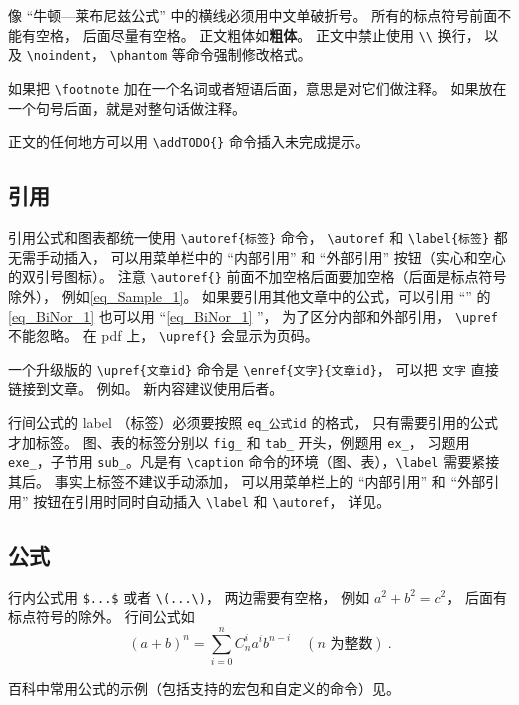 像 “牛顿—莱布尼兹公式” 中的横线必须用中文单破折号。 所有的标点符号前面不能有空格， 后面尽量有空格。 正文粗体如\textbf{粗体}。 正文中禁止使用 \verb`\\` 换行， 以及 \verb`\noindent`， \verb`\phantom` 等命令强制修改格式。

如果把 \verb`\footnote` 加在一个名词或者短语后面，意思是对它们做注释。 如果放在一个句号后面，就是对整句话做注释。

正文的任何地方可以用 \verb`\addTODO{}` 命令插入未完成提示。

\subsection{引用}
引用公式和图表都统一使用 \verb`\autoref{标签}` 命令， \verb`\autoref` 和 \verb`\label{标签}` 都无需手动插入， 可以用菜单栏中的 “内部引用” 和 “外部引用” 按钮（实心和空心的双引号图标）。 注意 \verb`\autoref{}` 前面不加空格后面要加空格（后面是标点符号除外）， 例如\autoref{eq_Sample_1}。 如果要引用其他文章中的公式，可以引用 “” 的\autoref{eq_BiNor_1} 也可以用 “\autoref{eq_BiNor_1} ”， 为了区分内部和外部引用， \verb`\upref` 不能忽略。 在 pdf 上， \verb`\upref{}` 会显示为页码。

一个升级版的 \verb`\upref{文章id}` 命令是 \verb`\enref{文字}{文章id}`， 可以把 \verb`文字` 直接链接到文章。 例如。 新内容建议使用后者。

行间公式的 label （标签）必须要按照 \verb`eq_公式id` 的格式， 只有需要引用的公式才加标签。 图、表的标签分别以 \verb`fig_` 和 \verb`tab_` 开头，例题用 \verb`ex_`， 习题用 \verb`exe_`，子节用 \verb`sub_`。凡是有 \verb`\caption` 命令的环境（图、表），\verb`\label` 需要紧接其后。 事实上标签不建议手动添加， 可以用菜单栏上的 “内部引用” 和 “外部引用” 按钮在引用时同时自动插入 \verb`\label` 和 \verb`\autoref`， 详见。

\subsection{公式}
行内公式用 \verb`$...$` 或者 \verb`\(...\)`， 两边需要有空格， 例如 $a^2+b^2=c^2$， 后面有标点符号的除外。 行间公式如
\begin{equation}\label{eq_Sample_1}
(a+b)^n = \sum_{i=0}^n C_n^i a^i b^{n-i} \quad (\text{$n$ 为整数})~.
\end{equation}

百科中常用公式的示例（包括支持的宏包和自定义的命令）见。

